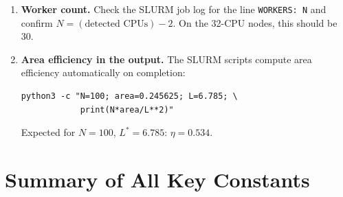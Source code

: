 \documentclass[11pt,oneside]{article}
\begin{document}
\begin{enumerate}[leftmargin=*,label=\textbf{\arabic*.}]
\item \textbf{Worker count.} Check the SLURM job log for the line
\texttt{WORKERS: N} and confirm $N = (\text{detected CPUs}) - 2$.
On the 32-CPU nodes, this should be 30.

\item \textbf{Area efficiency in the output.} The SLURM scripts compute
area efficiency automatically on completion:
\begin{lstlisting}[style=bashstyle]
python3 -c "N=100; area=0.245625; L=6.785; \
            print(N*area/L**2)"
\end{lstlisting}
Expected for $N=100$, $L^*=6.785$: $\eta = 0.534$.

\end{enumerate}

\section{Summary of All Key Constants}
\label{sec:summary}
\end{document}
